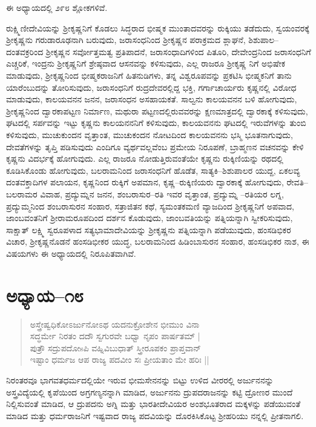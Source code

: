 ಈ ಅಧ್ಯಾಯದಲ್ಲಿ ೨೯೮ ಶ್ಲೋಕಗಳಿವೆ.

ರುಕ್ಷ್ಮಿಣೀದೇವಿಯನ್ನು ಶ‍್ರೀಕೃಷ್ಣನಿಗೆ ಕೊಡಲು ಸಿದ್ಧರಾದ ಭೀಷ್ಮಕ ಮುಂತಾದವರನ್ನು ರುಕ್ಕಿಯು ತಡೆದುದು, ಸ್ವಯಂವರಕ್ಕೆ ಶ‍್ರೀಕೃಷ್ಣನು ಗರುಡಾರೂಢನಾಗಿ ಬರುವುದು, ಜರಾಸಂಧನಿಂದ ಶ‍್ರೀಕೃಷ್ಣನ ಪರಾಕ್ರಮದ ಶ್ಲಾಘನೆ, ಶಿಶುಪಾಲ–ದಂತವಕ್ರರಿಂದ ಶ‍್ರೀಕೃಷ್ಣನ ಸರ್ವೋತ್ತಮತ್ವ ಪ್ರತಿಪಾದನೆ, ಜರಾಸಂಧಾದಿಗಳಿಂದ ಪಿತೂರಿ, ದೇವೇಂದ್ರನಿಂದ ಜರಾಸಂಧನಿಗೆ ಎಚ್ಚರಿಕೆ, ಇಂದ್ರನು ಶ‍್ರೀಕೃಷ್ಣನಿಗೆ ಶ್ರೇಷ್ಠವಾದ ಆಸನವನ್ನು ಕಳಿಸುವುದು, ಎಲ್ಲ ರಾಜರೂ ಶ‍್ರೀಕೃಷ್ಣ ನಿಗೆ ಅಭಿಷೇಕ ಮಾಡುವುದು, ಶ‍್ರೀಕೃಷ್ಣನಿಂದ ಭೀಷ್ಮಕರಾಜನಿಗೆ ಹಿತನುಡಿಗಳು, ತನ್ನ ವಿಶ್ವರೂಪವನ್ನು ಪ್ರಕಟಿಸಿ ಭೀಷ್ಮಕನಿಗೆ ತಾನು ಯಾರೆಂಬುದನ್ನು ತೋರಿಸುವುದು, ಜರಾಸಂಧನಿಗೆ ರುದ್ರದೇವರಲ್ಲಿದ್ದ ಭಕ್ತಿ, ಗರ್ಗಾಚಾರ್ಯರು ಕೃಷ್ಣನಲ್ಲಿ ವಿರೋಧ ಮಾಡುವುದು, ಕಾಲಯವನನ ಜನನ, ಜರಾಸಂಧನ ಅಸಹಾಯಕತೆ. ಸಾಲ್ವನು ಕಾಲಯವನನ ಬಳಿ ಹೋಗುವುದು, ಶ‍್ರೀಕೃಷ್ಣನಿಂದ ದ್ವಾರಕಾಪಟ್ಟಣ ನಿರ್ಮಾಣ, ಮಥುರಾ ಪಟ್ಟಣದಲ್ಲಿರುವವರನ್ನು ಕ್ಷಣಮಾತ್ರದಲ್ಲಿ ದ್ವಾರಕಾಕ್ಕೆ ಕಳಿಸುವುದು, ಘಟದಲ್ಲಿ ಸರ್ಪವನ್ನು ಇಟ್ಟು ಕೃಷ್ಣನು ಕಾಲಯನನನಿಗೆ ಕಳಿಸುವುದು, ಕಾಲಯವನನು ಘಟದಲ್ಲಿ ಇರುವೆಗಳನ್ನು ತುಂಬಿ ಕಳಿಸುವುದು, ಮುಚುಕುಂದನ ವೃತ್ತಾಂತ, ಮುಚುಕಂದನ ನೋಟದಿಂದ ಕಾಲಯವನನು ಭಸ್ಮಿ ಭೂತನಾಗುವುದು, ದೇವತೆಗಳನ್ನು ತೃಪ್ತಿ ಪಡಿಸುವುದು ಎಂದಿಗೂ ವ್ಯರ್ಥವಲ್ಲವೆಂಬ ಪ್ರಮೇಯ ನಿರೂಪಣೆ, ಬ್ರಾಹ್ಮಣನ ವಚನವನ್ನು ಕೇಳಿ ಕೃಷ್ಣನು ವಿದರ್ಭಕ್ಕೆ ಹೋಗುವುದು. ಎಲ್ಲ ರಾಜರೂ ನೋಡುತ್ತಿರುವಂತೆಯೇ ಕೃಷ್ಣನು ರುಕ್ಕಿಣಿಯನ್ನು ರಥದಲ್ಲಿ ಕೂಡಿಸಿಕೊಂಡು ಹೋಗುವುದು, ಬಲರಾಮನಿಂದ ಜರಾಸಂಧನಿಗೆ ಹೊಡೆತ, ಸಾತ್ಯಕಿ–ಶಿಶುಪಾಲರ ಯುದ್ದ, ಏಕಲವ್ಯ ದಂತವಕ್ತಾದಿಗಳ ಪಲಾಯನ, ಕೃಷ್ಣನಿಂದ ರುಕ್ಕಿಗೆ ಅಪಮಾನ, ಕೃಷ್ಣ–ರುಕ್ಕಿಣಿಯರು ದ್ವಾರಕಾಕ್ಕೆ ಹೋಗುವುದು, ರೇವತಿ–ಬಲರಾಮರ ವಿವಾಹ, ಪ್ರದ್ಯುಮ್ನನ ಜನನ, ಶಂಬರಾಸುರ–ರತಿ ಇವರ ವೃತ್ತಾಂತ, ಪ್ರದ್ಯುಮ್ನ –ರತಿಯರ ಲಗ್ನ, ಪ್ರದ್ಯುಮ್ಮನಿಂದ ಶಂಬರಾಸುರನ ಸಂಹಾರ, ಸತ್ರಾಜಿತನ ಕಥೆ, ಸ್ಯಮಂತಕಮಣಿ ವ್ಯಾಜದಿಂದ ಶ‍್ರೀಕೃಷ್ಣನಿಗೆ ಅಪವಾದ, ಜಾಂಬವಂತನಿಗೆ ಶ‍್ರೀರಾಮರೂಪದಿಂದ ದರ್ಶನ ಕೊಡುವುದು, ಜಾಂಬವತಿಯನ್ನು ಪತ್ನಿಯನ್ನಾಗಿ ಸ್ವೀಕರಿಸುವುದು, ಸಾಕ್ಷಾತ್ ಲಕ್ಷ್ಮಿ ಸ್ವರೂಪಳಾದ ಸತ್ಯಭಾಮಾದೇವಿಯನ್ನು ಶ‍್ರೀಕೃಷ್ಣನು ಪತ್ನಿಯನ್ನಾಗಿ ಪಡೆಯುವುದು, ಹಂಸಡಿಭಿಕರ ವಿಚಾರ, ಶ‍್ರೀಕೃಷ್ಣನೊಡನೆ ಹಂಸಡಿಭೀಕರ ಯುದ್ಧ, ಬಲರಾಮನಿಂದ ಹಿಡಿಂಬಾಸುರನ ಸಂಹಾರ, ಹಂಸಡಿಭಿಕರ ನಾಶ, ಈ ವಿಷಯಗಳು ಈ ಅಧ್ಯಾಯದಲ್ಲಿ ನಿರೂಪಿತವಾಗಿವೆ.


\section{ಅಧ್ಯಾಯ–೧೮}

\begin{verse}
ಅಸ್ತ್ರೇಷ್ವಧಿಕೋಽರ್ಜುನೋಽಥ ಯದನುಕ್ರೋಶೇನ ಭೀಮುಂ ವಿನಾ\\ ಸದ್ಧರ್ಮೇ ನಿರತಂ ದದೌ ಸ್ವಗುರವೇ ಬಧ್ವಾ ನೃಪಂ ಪಾರ್ಷತಮ್ |\\ ಪುತ್ರೌ ಸದ್ರುಪದೋsಪಿ ವಹ್ನಿವಿಬುಧಾತ್ ಸ್ತ್ರೀರೂಪಕಂ ಪ್ರಾಪ್ತವಾನ್\\ ಇಷ್ಟಾಂ ಧರ್ಮಜ ಆಪ ರಾಜ್ಯ ಪದವೀಂ ಸಃ ಪ್ರೀಯತಾಂ ಮೇ ಹರಿಃ ||
\end{verse}

ನಿರಂತರವೂ ಭಾಗವತಧರ್ಮದಲ್ಲಿಯೇ ಇರುವ ಭೀಮಸೇನನನ್ನು ಬಿಟ್ಟು ಉಳಿದ ವೀರರಲ್ಲಿ ಅರ್ಜುನನನ್ನು ಅಸ್ತ್ರವಿದ್ಯೆಯಲ್ಲಿ ಕೃಪೆಯಿಂದ ಅಗ್ರಗಣ್ಯನನ್ನಾಗಿ ಮಾಡಿದ, ಅರ್ಜುನನು ದ್ರುಪದರಾಜನನ್ನು ಕಟ್ಟಿ ದ್ರೋಣರ ಮುಂದೆ ನಿಲ್ಲಿಸುವಂತೆ ಮಾಡಿದ, ಆ ದ್ರುಪದನು ಅಗ್ನಿ ಮತ್ತು ಭಾರತೀದೇವಿಯರ ಅಂಶಭೂತರಾದ ಮಕ್ಕಳನ್ನು ಪಡೆಯುವಂತೆ ಮಾಡಿದ ಮತ್ತು ಧರ್ಮರಾಜನಿಗೆ ಇಷ್ಟವಾದ ರಾಜ್ಯ ಪದವಿಯನ್ನು ದೊರಕಿಸಿಕೊಟ್ಟ ಶ‍್ರೀಹರಿಯು ನನ್ನಲ್ಲಿ ಪ್ರೀತನಾಗಲಿ.

